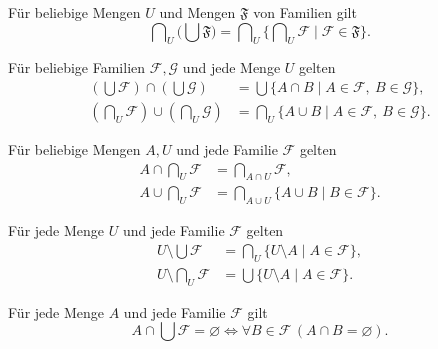 \begin{theorem}
Für beliebige Mengen $U$ und Mengen $\mathfrak F$ von Familien gilt
\[
 \bigcap\nolimits_U\bigl(\bigcup\mathfrak F\bigr)
   =\bigcap\nolimits_U
            \{\bigcap\nolimits_U\mathcal F\mid\mathcal F\in\mathfrak F\}.
\]
\end{theorem}

\begin{theorem}
Für beliebige Familien $\mathcal F,\mathcal G$ und jede Menge $U$
gelten
\[
\begin{aligned}
 (\bigcup\mathcal F)\cap(\bigcup\mathcal G)
   &=\bigcup\{A\cap B\mid A\in\mathcal F,\ B\in\mathcal G\},\\
 (\bigcap\nolimits_U\mathcal F)\cup(\bigcap\nolimits_U\mathcal G)
   &=\bigcap\nolimits_U\{A\cup B\mid A\in\mathcal F,\ B\in\mathcal G\}.
\end{aligned}
\]
\end{theorem}

\begin{theorem}
Für beliebige Mengen $A,U$ und jede Familie $\mathcal F$ gelten
\[
\begin{aligned}
 A\cap\bigcap\nolimits_U\mathcal F
      &=\bigcap\nolimits_{A\cap U}\mathcal F,\\
 A\cup\bigcap\nolimits_U\mathcal F
      &=\bigcap\nolimits_{A\cup U}\{A\cup B\mid B\in\mathcal F\}.
\end{aligned}
\]
\end{theorem}

\begin{theorem}
Für jede Menge $U$ und jede Familie $\mathcal F$ gelten
\[
\begin{aligned}
 U\setminus\bigcup\mathcal F
   &=\bigcap\nolimits_U\{U\setminus A\mid A\in\mathcal F\},\\
 U\setminus\bigcap\nolimits_U\mathcal F
   &=\bigcup\{U\setminus A\mid A\in\mathcal F\}.
\end{aligned}
\]
\end{theorem}

\begin{theorem}
Für jede Menge $A$ und jede Familie $\mathcal F$ gilt
\[
 A\cap\bigcup\mathcal F=\varnothing
 \Longleftrightarrow
     \forall B\in\mathcal F\,(A\cap B=\varnothing).
\]
\end{theorem}
